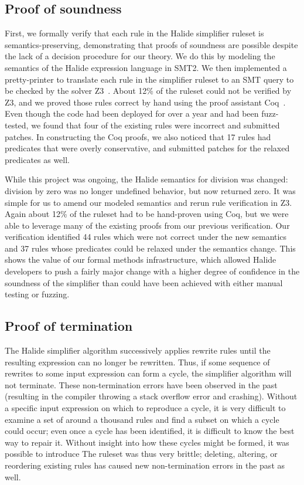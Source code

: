 \subsection{Proof of soundness}
First, we formally verify that each rule in the Halide simplifier ruleset is semantics-preserving, demonstrating that proofs of soundness are possible despite the lack of a 
decision procedure for our theory. We do this by modeling the semantics of the Halide expression language in SMT2. We then implemented a pretty-printer to translate each rule in the simplifier ruleset to an SMT query to be checked by the solver Z3~\citep{de2008z3}. About 12\% of the ruleset could not be verified by Z3, and we proved those rules correct by hand using the proof assistant Coq~\citep{Coq19}. Even though the code had been deployed for over a year and had been fuzz-tested, we found that four of the existing rules were incorrect and submitted patches. In constructing the Coq proofs, we also noticed that 17 rules had predicates that were overly conservative, and submitted patches for the relaxed predicates as well.

While this project was ongoing, the Halide semantics for division was changed: division by zero was no longer undefined behavior, but now returned zero. It was simple for us to amend our modeled semantics and rerun rule verification in Z3. Again about 12\% of the ruleset had to be hand-proven using Coq, but we were able to leverage many of the existing proofs from our previous verification. Our verification identified 44 rules which were not correct under the new semantics and 37 rules whose predicates could be relaxed under the semantics change. This shows the value of our formal methods infrastructure, which allowed Halide developers to push a fairly major change with a higher degree of confidence in the soundness of the simplifier than could have been achieved with either manual testing or fuzzing.

\subsection{Proof of termination}
The Halide simplifier algorithm successively applies rewrite rules until the resulting expression can no longer be rewritten. Thus, if some sequence of rewrites to some input expression can form a cycle, the simplifier algorithm will not terminate. These non-termination errors have been observed in the past (resulting in the compiler throwing a stack overflow error and crashing). Without a specific input expression on which to reproduce a cycle, it is very difficult to examine a set of around a thousand rules and find a subset on which a cycle could occur; even once a cycle has been identified, it is difficult to know the best way to repair it. Without insight into how these cycles might be formed, it was possible to introduce The ruleset was thus very brittle; deleting, altering, or reordering existing rules has caused new non-termination errors in the past as well.

